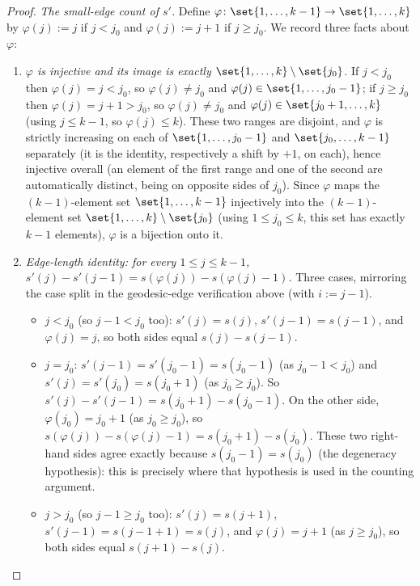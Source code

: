 \begin{proof}
  \emph{The small-edge count of $s'$.} Define $\varphi \colon \set{1,\dots,k-1} \to
  \set{1,\dots,k}$ by $\varphi(j) := j$ if $j<j_0$ and $\varphi(j):=j+1$ if $j \ge j_0$. We record
  three facts about $\varphi$:
  \begin{enumerate}
    \item[(a)] \emph{$\varphi$ is injective and its image is exactly $\set{1,\dots,k}\setminus
    \set{j_0}$.} If $j<j_0$ then $\varphi(j)=j<j_0$, so $\varphi(j)\ne j_0$ and $\varphi(j)\in
    \set{1,\dots,j_0-1}$; if $j\ge j_0$ then $\varphi(j)=j+1>j_0$, so $\varphi(j)\ne j_0$ and
    $\varphi(j)\in\set{j_0+1,\dots,k}$ (using $j\le k-1$, so $\varphi(j)\le k$). These two ranges
    are disjoint, and $\varphi$ is strictly increasing on each of $\set{1,\dots,j_0-1}$ and
    $\set{j_0,\dots,k-1}$ separately (it is the identity, respectively a shift by $+1$, on each),
    hence injective overall (an element of the first range and one of the second are automatically
    distinct, being on opposite sides of $j_0$). Since $\varphi$ maps the $(k-1)$-element set
    $\set{1,\dots,k-1}$ injectively into the $(k-1)$-element set $\set{1,\dots,k}\setminus\set{j_0}$
    (using $1\le j_0\le k$, this set has exactly $k-1$ elements), $\varphi$ is a bijection onto it.
    \item[(b)] \emph{Edge-length identity: for every $1\le j\le k-1$,
    $s'(j)-s'(j-1) = s(\varphi(j)) - s(\varphi(j)-1)$.} Three cases, mirroring the case split in
    the geodesic-edge verification above (with $i:=j-1$).
    \begin{itemize}
      \item $j<j_0$ (so $j-1<j_0$ too): $s'(j)=s(j)$, $s'(j-1)=s(j-1)$, and $\varphi(j)=j$, so
      both sides equal $s(j)-s(j-1)$.
      \item $j=j_0$: $s'(j-1) = s'(j_0-1) = s(j_0-1)$ (as $j_0-1<j_0$) and
      $s'(j)=s'(j_0)=s(j_0+1)$ (as $j_0\ge j_0$). So $s'(j)-s'(j-1) = s(j_0+1)-s(j_0-1)$. On the
      other side, $\varphi(j_0)=j_0+1$ (as $j_0\ge j_0$), so $s(\varphi(j))-s(\varphi(j)-1) =
      s(j_0+1)-s(j_0)$. These two right-hand sides agree exactly because $s(j_0-1)=s(j_0)$ (the
      degeneracy hypothesis): this is precisely where that hypothesis is used in the counting
      argument.
      \item $j>j_0$ (so $j-1\ge j_0$ too): $s'(j)=s(j+1)$, $s'(j-1)=s(j-1+1)=s(j)$, and
      $\varphi(j)=j+1$ (as $j\ge j_0$), so both sides equal $s(j+1)-s(j)$.
    \end{itemize}
  \end{enumerate}

\end{proof}
